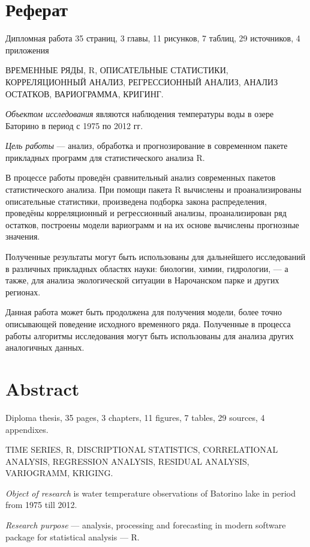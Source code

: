 \newpage

\chapter*{Реферат}
Дипломная работа 35 страниц, 3 главы, 11 рисунков, 7 таблиц, 29 источников, 4 приложения

ВРЕМЕННЫЕ РЯДЫ, R, ОПИСАТЕЛЬНЫЕ СТАТИСТИКИ, КОРРЕЛЯЦИОННЫЙ АНАЛИЗ, РЕГРЕССИОННЫЙ АНАЛИЗ, АНАЛИЗ ОСТАТКОВ, ВАРИОГРАММА, КРИГИНГ.

\textit{Объектом исследования} являются наблюдения температуры воды в озере Баторино в период с 1975 по 2012 гг.

\textit{Цель работы} --- анализ, обработка и прогнозирование в современном пакете прикладных программ для статистического анализа R.

В процессе работы проведён сравнительный анализ современных пакетов статистического анализа. При помощи пакета R вычислены и проанализированы описательные статистики, произведена подборка закона распределения, проведёны корреляционный и регрессионный анализы, проанализирован ряд остатков, построены модели вариограмм и на их основе вычислены прогнозные значения.

Полученные результаты могут быть использованы для дальнейшего исследований в различных прикладных областях науки: биологии, химии, гидрологии, --- а также, для анализа экологической ситуации в Нарочанском парке и других регионах.

Данная работа может быть продолжена для получения модели, более точно описывающей поведение исходного временного ряда. Полученные в процесса работы алгоритмы исследования могут быть использованы для анализа других аналогичных данных.

\newpage

\chapter*{Abstract}
Diploma thesis, 35 pages, 3 chapters, 11 figures, 7 tables, 29 sources, 4 appendixes.

TIME SERIES, R, DISCRIPTIONAL STATISTICS, CORRELATIONAL ANALYSIS, REGRESSION ANALYSIS, RESIDUAL ANALYSIS, VARIOGRAMM, KRIGING.

\textit{Object of research} is water temperature observations of Batorino lake in period from 1975 till 2012.

\textit{Research purpose} --- analysis, processing and forecasting in modern software package for statistical analysis --- R.

